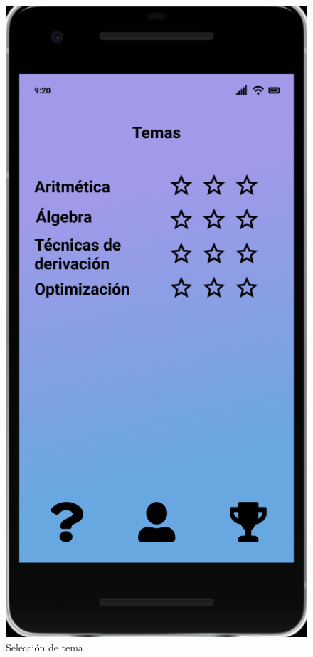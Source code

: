 \documentclass{article}
\begin{document}
\begin{figure}[H]
    \centering
    \includegraphics[scale=0.9]{imgs/Figma/Temas}
    \caption{Selección de tema}
\end{figure}
\end{document}
